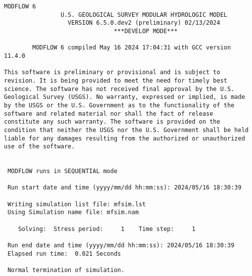 {\small
\begin{lstlisting}[style=modeloutput]
                                   MODFLOW 6
                U.S. GEOLOGICAL SURVEY MODULAR HYDROLOGIC MODEL
                  VERSION 6.5.0.dev2 (preliminary) 02/13/2024
                               ***DEVELOP MODE***

        MODFLOW 6 compiled May 16 2024 17:04:31 with GCC version 11.4.0

This software is preliminary or provisional and is subject to 
revision. It is being provided to meet the need for timely best 
science. The software has not received final approval by the U.S. 
Geological Survey (USGS). No warranty, expressed or implied, is made 
by the USGS or the U.S. Government as to the functionality of the 
software and related material nor shall the fact of release 
constitute any such warranty. The software is provided on the 
condition that neither the USGS nor the U.S. Government shall be held 
liable for any damages resulting from the authorized or unauthorized 
use of the software.


 MODFLOW runs in SEQUENTIAL mode

 Run start date and time (yyyy/mm/dd hh:mm:ss): 2024/05/16 18:30:39

 Writing simulation list file: mfsim.lst
 Using Simulation name file: mfsim.nam

    Solving:  Stress period:     1    Time step:     1

 Run end date and time (yyyy/mm/dd hh:mm:ss): 2024/05/16 18:30:39
 Elapsed run time:  0.021 Seconds

 Normal termination of simulation.
\end{lstlisting}
}
